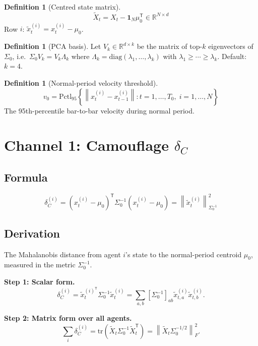 \documentclass[11pt,a4paper]{article}
\theoremstyle{definition}
\newtheorem{definition}[theorem]{Definition}
\newcommand{\R}{\mathbb{R}}
\newcommand{\T}{^{\mathsf{T}}}
\newcommand{\norm}[1]{\left\|#1\right\|}
\newcommand{\diag}{\mathrm{diag}}
\newcommand{\tr}{\mathrm{tr}}
\begin{document}
\begin{definition}[Centred state matrix]
\[
\tilde X_t = X_t - \mathbf{1}_N\mu_0\T \in \R^{N\times d}
\]
Row $i$: $\tilde x_t^{(i)} = x_t^{(i)} - \mu_0$.
\end{definition}

\begin{definition}[PCA basis]
Let $V_k \in \R^{d\times k}$ be the matrix of top-$k$ eigenvectors of $\Sigma_0$,
i.e.\ $\Sigma_0 V_k = V_k \Lambda_k$ where $\Lambda_k = \diag(\lambda_1,\dots,\lambda_k)$
with $\lambda_1 \geq \cdots \geq \lambda_k$.
Default: $k=4$.
\end{definition}

\begin{definition}[Normal-period velocity threshold]
\[
v_0 = \mathrm{Pctl}_{95}\!\left\{\norm{x_t^{(i)} - x_{t-1}^{(i)}} : t = 1,\dots,T_0,\; i=1,\dots,N\right\}
\]
The 95th-percentile bar-to-bar velocity during normal period.
\end{definition}

\section{Channel 1: Camouflage $\delta_C$}

\subsection{Formula}

\begin{lockedbox}
\[
\delta_C^{(i)} = (x_t^{(i)} - \mu_0)\T\Sigma_0^{-1}(x_t^{(i)} - \mu_0)
= \norm{\tilde x_t^{(i)}}_{\Sigma_0^{-1}}^2
\]
\end{lockedbox}

\subsection{Derivation}

The Mahalanobis distance from agent $i$'s state to the normal-period centroid $\mu_0$,
measured in the metric $\Sigma_0^{-1}$.

\textbf{Step 1: Scalar form.}
\[
\delta_C^{(i)} = \tilde x_t^{(i)\T}\Sigma_0^{-1}\tilde x_t^{(i)} = \sum_{a,b}[\Sigma_0^{-1}]_{ab}\tilde x_{t,a}^{(i)}\tilde x_{t,b}^{(i)}.
\]

\textbf{Step 2: Matrix form over all agents.}
\[
\sum_i \delta_C^{(i)} = \tr(\tilde X_t \Sigma_0^{-1}\tilde X_t\T) = \norm{\tilde X_t\Sigma_0^{-1/2}}_F^2.
\]
\end{document}
